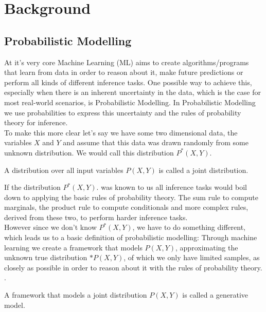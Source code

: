 \usetikzlibrary{calc}

\renewcommand{\vec}[1]{\textbf{#1}}
\newcommand{\norm}[1]{\left\lVert#1\right\rVert}


\chapter{Background}
\label{cha:background}

\section{Probabilistic Modelling}
\label{sec:pm}

At it's very core Machine Learning (ML) aims to create algorithms/programs that learn from data in order to reason about it, make future
predictions or perform all kinds of different inference tasks. One possible way to achieve this, especially when there is an inherent 
uncertainty in the data, which is the case for most real-world scenarios, is Probabilistic Modelling. In Probabilistic Modelling we 
use probabilities to express this uncertainty and the rules of probability theory for inference. \\
To make this more clear let's say we have some two dimensional data, the variables $X$ and $Y$ and assume that this data was drawn randomly from some unknown distribution. 
We would call this distribution $P^*(X, Y)$. 

\begin{definition}
    A distribution over all input variables $P(X, Y)$ is called a joint distribution.
\end{definition}

If the distribution $P^*(X, Y)$. was known to us all inference tasks would boil down to applying the basic 
rules of probability theory. The sum rule to compute marginals, the product rule to compute conditionals and more complex rules, derived 
from these two, to perform harder inference tasks. \\
However since we don't know $P^*(X, Y)$, we have to do something different, which leads us to a basic definition of probabilistic modelling:
Through machine learning we create a framework that models $P(X, Y)$, approximating the unknown true distribution $*P(X, Y)$, of which we only have limited samples, 
as closely as possible in order to reason about it with the rules of probability theory. \cite{pc_intro}. \\

\begin{definition}
    A framework that models a joint distribution $P(X, Y)$ is called a generative model.
\end{definition}

